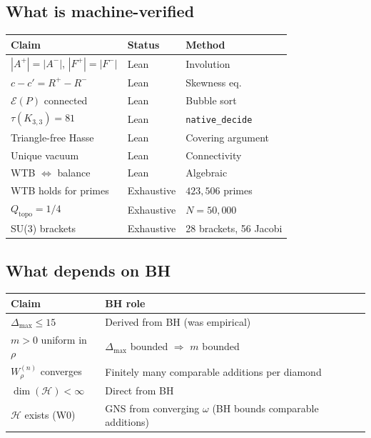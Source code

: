 \documentclass[11pt]{article}
\newcommand{\Kthree}{K_{3,3}}
\newcommand{\hilb}{\mathscr{H}}
\begin{document}
\subsection{What is machine-verified}

\begin{center}
\renewcommand{\arraystretch}{1.3}
\begin{tabular}{llp{5cm}}
\toprule
\textbf{Claim} & \textbf{Status} & \textbf{Method} \\
\midrule
$|A^+| = |A^-|$, $|F^+| = |F^-|$ & Lean & Involution \\
$c - c' = R^+ - R^-$ & Lean & Skewness eq.\ \\
$\mathcal{E}(P)$ connected & Lean & Bubble sort \\
$\tau(\Kthree) = 81$ & Lean & \texttt{native\_decide} \\
Triangle-free Hasse & Lean & Covering argument \\
Unique vacuum & Lean & Connectivity \\
WTB $\Leftrightarrow$ balance & Lean & Algebraic \\
\midrule
WTB holds for primes & Exhaustive & $423{,}506$ primes \\
$Q_{\mathrm{topo}} = 1/4$ & Exhaustive & $N = 50{,}000$ \\
SU(3) brackets & Exhaustive & 28 brackets, 56 Jacobi \\
\bottomrule
\end{tabular}
\end{center}

\subsection{What depends on BH}

\begin{center}
\renewcommand{\arraystretch}{1.3}
\begin{tabular}{lp{7cm}}
\toprule
\textbf{Claim} & \textbf{BH role} \\
\midrule
$\Delta_{\max} \le 15$ &
  Derived from BH (was empirical) \\
$m > 0$ uniform in $\rho$ &
  $\Delta_{\max}$ bounded $\Rightarrow$ $m$ bounded \\
$W^{(n)}_\rho$ converges &
  Finitely many comparable additions per diamond \\
$\dim(\hilb) < \infty$ &
  Direct from BH \\
$\hilb$ exists (W0) &
  GNS from converging $\omega$ (BH bounds comparable additions) \\
\bottomrule
\end{tabular}
\end{center}
\end{document}
